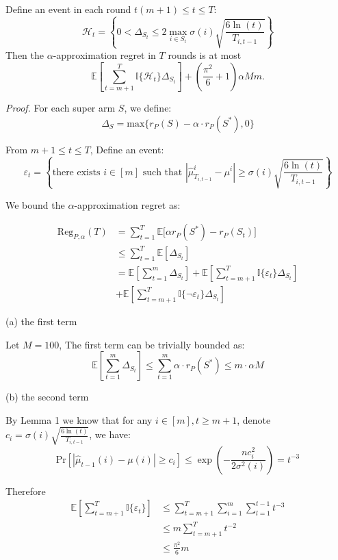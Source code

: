\documentclass[opre,sglanonrev]{informs4}
\begin{document}
\begin{appendices}
\begin{lemma}
Define an event in each round $t(m+1)\leq t \leq T$:
$$
	\mathcal{H}_t = \left\{0<\Delta_{S_t}\leq 2\mathop{\max}\limits_{i\in S_t}\sigma(i)\sqrt{\frac{6\ln(t)}{T_{i,t-1}}}\right\}
$$
Then the $\alpha$-approximation regret in $T$ rounds is at most
$$
	\mathbb{E}[\sum_{t=m+1}^{T}\mathbb{I}\{\mathcal{H}_t\}\Delta_{S_t}] + (\frac{\pi^2}{6}+1)\alpha M m.
$$
\end{lemma}
\textit{Proof.} For each super arm $S$, we define:
$$
\Delta_S = \text{max}\{r_P(S) - \alpha \cdot r_P(S^*), 0 \}
$$

From $m+1\leq t \leq T$, Define an event:
$$
\varepsilon_t = \left\{\text{there exists } i \in [m] \text{ such that } |\hat{\mu}_{T_{i,t-1}}^i-\mu^i| \geq \sigma(i)\sqrt{\frac{6\ln(t)}{T_{i,t-1}}}\right\}
$$

We bound the $\alpha$-approximation regret as:

\begin{equation}
	\begin{aligned}
		  \text{Reg}_{P,\alpha}(T) &= \sum_{t=1}^{T}\mathbb{E}\big[\alpha r_P(S^*) - r_P(S_t)\big]\\
		  &\leq \sum_{t=1}^{T}\mathbb{E}[\Delta_{S_t}]\\
		  &=\mathbb{E}[\sum_{t=1}^{m}\Delta_{S_t}]+\mathbb{E}[\sum_{t=m+1}^{T}\mathbb{I}\{\varepsilon_t\}\Delta_{S_t}]\\
		  &+\mathbb{E}[\sum_{t=m+1}^{T}\mathbb{I}\{\lnot \varepsilon_t\}\Delta_{S_t}]
	\end{aligned}
\end{equation}

(a) the first term 

Let $M  = 100$, The first term can be trivially bounded as:
\begin{equation}
	\mathbb{E}[\sum_{t=1}^{m}\Delta_{S_t}] \leq \sum_{t=1}^{m}\alpha \cdot r_P(S^*) \leq m \cdot \alpha M
\end{equation}

(b) the second term 

By Lemma 1 we know that for any $i \in [m],t\geq m+1$, denote $c_i = \sigma(i)\sqrt{\frac{6\ln(t)}{T_{i,t-1}}}$, we have:
$$
	\text{Pr}[|\hat{\mu}_{t-1}(i)-\mu(i)|\geq c_i] \leq \exp(-\frac{nc_i^2}{2\sigma^2(i)}) = t^{-3}
$$

Therefore
\begin{equation}
	\begin{aligned}
		\mathbb{E}[\sum_{t=m+1}^{T}\mathbb{I}\{\varepsilon_t\}]
		&\leq \sum_{t=m+1}^{T} \sum_{i=1}^{m} \sum_{l=1}^{t-1}t^{-3} \\
		&\leq m \sum_{t=m+1}^{T}t^{-2} \\
		&\leq \frac{\pi^2}{6}m
	\end{aligned}
\end{equation}


\end{appendices}
\end{document}
